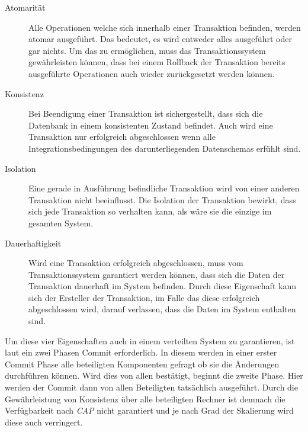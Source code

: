 \begin{description}
    \item[Atomarität] Alle Operationen welche sich innerhalb einer Transaktion befinden, werden atomar ausgeführt. Das bedeutet, es wird entweder alles ausgeführt oder gar nichts. Um das zu ermöglichen, muss das Transaktionssystem gewährleisten können, dass bei einem Rollback der Transaktion bereits ausgeführte Operationen auch wieder zurückgesetzt werden können. 
    \item[Konsistenz] Bei Beendigung einer Transaktion ist sichergestellt, dass sich die Datenbank in einem konsistenten Zustand befindet. Auch wird eine Transaktion nur erfolgreich abgeschlossen wenn alle Integrationsbedingungen des darunterliegenden Datenschemas erfühlt sind. 
    \item[Isolation] Eine gerade in Ausführung befindliche Transaktion wird von einer anderen Transaktion nicht beeinflusst. Die Isolation der Transaktion bewirkt, dass sich jede Transaktion so verhalten kann, als wäre sie die einzige im gesamten System.
    \item[Dauerhaftigkeit] Wird eine Transaktion erfolgreich abgeschlossen, muss vom Transaktionssystem garantiert werden können, dass sich die Daten der Transaktion dauerhaft im System befinden. Durch diese Eigenschaft kann sich der Ersteller der Transaktion, im Falle das diese erfolgreich abgeschlossen wird, darauf verlassen, dass die Daten im System enthalten sind.
\end{description}
Um diese vier Eigenschaften auch in einem verteilten System zu garantieren, ist laut \cite{PritchettBASE} ein zwei Phasen Commit erforderlich. In diesem werden in einer erster Commit Phase alle beteiligten Komponenten gefragt ob sie die Änderungen durchführen können. Wird dies von allen bestätigt, beginnt die zweite Phase. Hier werden der Commit dann von allen Beteiligten tatsächlich ausgeführt. Durch die Gewährleistung von Konsistenz über alle beteiligten Rechner ist demnach die Verfügbarkeit nach \textit{CAP} nicht garantiert und je nach Grad der Skalierung wird diese auch verringert.

